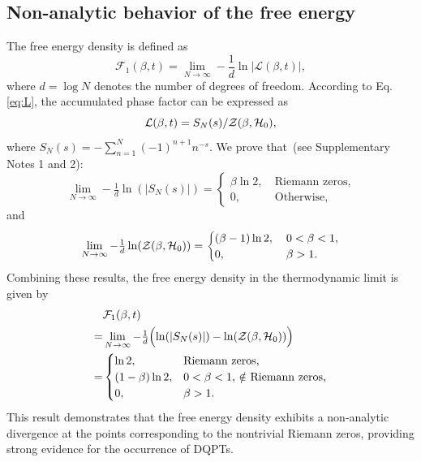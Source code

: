 \documentclass[aps,pra,twocolumn,superscriptaddress,preprintnumbers,amsmath,amssymb]{revtex4-2}
\begin{document}
\subsection{Non-analytic behavior of the free energy}\label{Methods:free energy}
The free energy density is defined as
\begin{equation}
    \mathcal{F}_1(\beta,t)=\lim_{N\rightarrow \infty}-\frac{1}{d}\ln |\mathcal{L}(\beta,t)|,
\end{equation}
where $d=\log N$ denotes the number of degrees of freedom. According to  Eq. \eqref{eq:L}, the accumulated phase factor can be expressed as
\begin{equation}
        {\cal L}(\beta,t)
    =S_N(s)/{\cal Z}(\beta,\mathcal{H}_0),
\end{equation}
 where $S_N(s)=-\textstyle\sum\limits_{n=1}^{N}(-1)^{n+1}n^{-s}$.
We prove that~(see Supplementary Notes 1 and 2):
\begin{equation}
    \textstyle\lim\limits_{N\rightarrow\infty}-\tfrac{1}{d}\ln(|S_N(s)|)
    =
    \begin{cases}
        \beta \ln2,\:&\text{Riemann zeros},\\
        0,\: &\text{Otherwise},
    \end{cases}
\end{equation}
and 
\begin{equation}
    \textstyle\lim\limits_{N\rightarrow\infty}-\tfrac{1}{d}\ln({\cal Z}(\beta,\mathcal{H}_0))
    =
    \begin{cases}
        (\beta-1)\ln2,\:&0<\beta<1,\\
        0,\: &\beta>1.
    \end{cases}
\end{equation} Combining these results, the free energy density in the thermodynamic limit is given by
\begin{align}\label{eq:thermal}
&\mathcal{F}_1(\beta,t)\notag\\
=&\lim_{N\rightarrow\infty}-\tfrac{1}{d}\Bigl(\ln(|
S_N(s)|)-\ln({\cal Z}(\beta,\mathcal{H}_0))\Bigr)\notag\\
    =&\begin{cases}
        \ln2, &\text{Riemann zeros,}\\
        (1-\beta)\ln 2, & 0<\beta<1 \text{, $\notin$ Riemann zeros,}\\
        0, &\beta>1.
    \end{cases}
\end{align}
This result demonstrates that the free energy density exhibits a non-analytic divergence at the points corresponding to the nontrivial Riemann zeros, providing strong evidence for the occurrence of  DQPTs.
\end{document}
